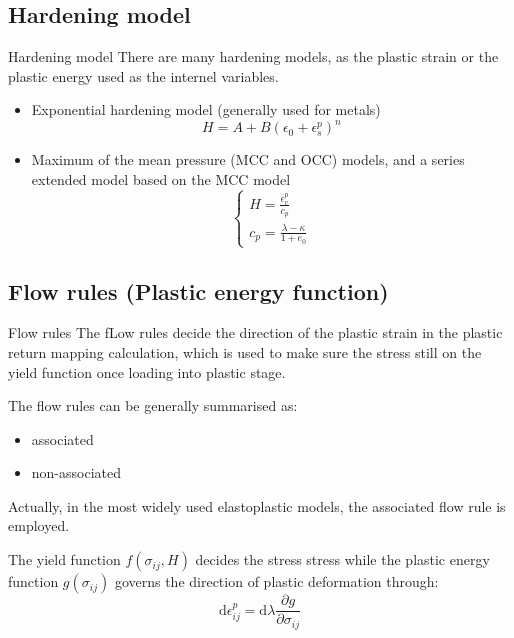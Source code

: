 \documentclass[aspectratio=169]{beamer}
\begin{document}
\subsection{Hardening model}

\begin{frame}{Hardening model}
    There are many hardening models, as the plastic strain or the plastic energy used as the internel variables.
    \begin{itemize}
        \item Exponential hardening model (generally used for metals)
        \begin{equation}
            H=A+B(\epsilon_0+\epsilon_{s}^{p})^n
            \label{eq: exponential hardening model}
        \end{equation}
        
        \item Maximum of the mean pressure (MCC and OCC) models, and a series extended model based on the MCC model
        \begin{equation}
            \left\{\begin{matrix}
                H = \frac{\epsilon_v^p}{c_p}\\
                c_p = \frac{\lambda-\kappa}{1+e_0}
            \end{matrix}\right.
            \label{eq: maximum mean pressure}
        \end{equation}
        
    \end{itemize}
\end{frame}

\subsection{Flow rules (Plastic energy function)}
\begin{frame}{Flow rules}
    The fLow rules decide the direction of the plastic strain in the plastic return mapping calculation, which is used to make sure the stress still on the yield function once loading into plastic stage.
    
    \vspace{0.2cm}
    The flow rules can be generally summarised as:
    \begin{itemize}
        \item associated 
        \item non-associated
    \end{itemize}
    
    \vspace{0.2cm}
    Actually, in the most widely used elastoplastic models, the associated flow rule is employed.
    
    \vspace{0.2cm}
    The yield function $f(\sigma_{ij}, H)$ decides the stress stress while the plastic energy function $g(\sigma_{ij})$ governs the direction of plastic deformation through:
    \begin{equation}
    \mathrm{d}\epsilon_{ij}^{p}=\mathrm{d}\lambda \frac{\partial g}{\partial \sigma_{ij}}
    \label{eq: plastic flow}
    \end{equation}
\end{frame}
\end{document}
